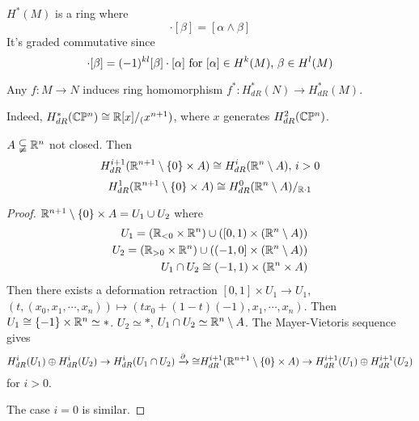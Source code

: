 \begin{remark}
     $ H^*(M ) $ is a ring where 
     \begin{equation}
        [\alpha]\cdot[\beta]=[\alpha\wedge \beta]
     \end{equation}
    It's graded commutative since 
    \begin{equation}
        [\alpha]\cdot[\beta]=(-1)^{kl}[\beta]\cdot[\alpha]\text{ for  $ [\alpha]\in H^k(M) $, $ \beta\in H^{l}(M) $}
    \end{equation}
    
    Any  $ f:M\rightarrow N     $ induces ring homomorphism  $ f^*:H^*_{dR}(N)\rightarrow H^*_{dR}(M) $.

    Indeed,  $ H_{dR}^*(\mathbb C\mathbb P^n)\cong\mathbb R[x]/_(x^{n+1}) $, where $ x  $ generates  $ H_{dR}^2(\mathbb C\mathbb P^n) $.
\end{remark}

\begin{proposition}\label{inductive prop in de-rham}
     $ A\subsetneqq \mathbb R^n $ not closed. Then 
     \begin{equation}
        H_{dR}^{i+1}(\mathbb R^{n+1}\setminus\{0\}\times A)\cong H^i_{dR}(\mathbb R^n\setminus A),\, i>0
     \end{equation}
     \begin{equation}
        H^1_{dR}(\mathbb R^{n+1}\setminus\{0\}\times A)\cong H_{dR}^0(\mathbb R^n\setminus A)/_{\mathbb R\cdot 1}
     \end{equation}
\end{proposition}
\begin{proof}
     $ \mathbb R^{n+1}\setminus\{0\}\times A=U_1\cup U_2 $ where 
     \begin{equation*}
        \begin{aligned}
            U_1=(\mathbb R_{<0}\times \mathbb R^n)\cup ([0,1)\times(\mathbb R^n\setminus A))\\
            U_2=(\mathbb R_{>0}\times \mathbb R^n)\cup((-1,0]\times(\mathbb R^n\setminus A))\\
            U_1\cap U_2\cong (-1,1)\times (\mathbb R^n\times A)
        \end{aligned}
     \end{equation*} 
     Then there exists a deformation retraction  $ [0,1]\times U_1\rightarrow U_1 $, $ (t,(x_0,x_1,\cdots,x_n))\mapsto (tx_0+(1-t)(-1),x_1,\cdots,x_n)  $. Then  $ U_1\cong\{-1\}\times \mathbb R^n\simeq * $.  $ U_2\simeq * $,  $ U_1\cap U_2\simeq \mathbb R^n\setminus A $. The Mayer-Vietoris sequence gives 
 \begin{equation*}
   H^i_{dR}(U_1)\oplus H_{dR}^i(U_2)\rightarrow H_{dR}^i(U_1\cap U_2)\xrightarrow{\partial}{\cong}H_{dR}^{i+1}(\mathbb R^{n+1}\setminus\{0\}\times A)\rightarrow H_{dR}^{i+1}(U_1)\oplus H_{dR}^{i+1}(U_2)
 \end{equation*} 
for  $ i>0 $. 

The case  $ i=0 $ is similar. 
\end{proof}

